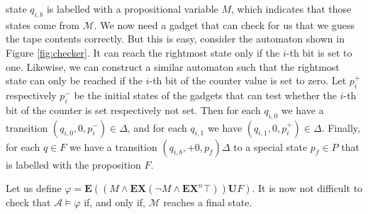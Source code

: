 \documentclass{llncs}
\begin{document}
state $q_{i,b}$ is labelled with a propositional variable $M$, which
indicates that those states come from $\mathcal{M}$. We now need a
gadget that can check for us that we guess the tape contents
correctly. But this is easy, consider the automaton shown in Figure
\ref{fig:checker}. It can reach the rightmost state only if the $i$-th
bit is set to one. Likewise, we can construct a similar automaton such
that the rightmost state can only be reached if the $i$-th bit of the
counter value is set to zero. Let $p_i^+$ respectively $p_i^-$ be the
initial states of the gadgets that can test whether the $i$-th bit of
the counter is set respectively not set. Then for each $q_{i,0}$ we
have a transition $(q_{i,0}, 0,p_i^-)\in \Delta$, and for each
$q_{i,1}$ we have $(q_{i,1}, 0, p_i^+)\in \Delta$. Finally, for each
$q\in F$ we have a transition $(q_{i,b}, +0, p_f)\Delta$ to a special
state $p_f\in P$ that is labelled with the proposition $F$.

Let us define $\varphi=\mathbf{E}((M\wedge \mathbf{EX}(\neg M \wedge
\mathbf{EX}^n \top)) \mathbf{U} F)$. It is now not difficult to check that
$\mathcal{A}\models \varphi$ if, and only if, $\mathcal{M}$ reaches a
final state.
\end{document}
